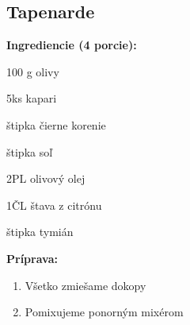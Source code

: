 \setcounter{step}{0}

\subsection{ Tapenarde }

\begin{ingredient}
  
  \def\portions{  }
  \textbf{ {\normalsize Ingrediencie (4 porcie):} }

  \begin{main}
      \item 100 g olivy
      \item 5ks kapari
      \item štipka čierne korenie
      \item štipka soľ
      \item 2PL olivový olej
      \item 1ČL štava z citrónu
      \item štipka tymián
  \end{main}
  
\end{ingredient}
\begin{recipe}
\textbf{ {\normalsize Príprava:} }
\begin{enumerate}

  \item{Všetko zmiešame dokopy}
  \item{Pomixujeme ponorným mixérom}

\end{enumerate}
\end{recipe}

\begin{notes}
  
\end{notes}	
\clearpage

